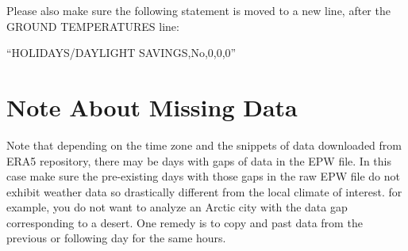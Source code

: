 \documentclass[12pt]{article}
\begin{document}
Please also make sure the following statement is moved to a new line, after the GROUND TEMPERATURES line:

``HOLIDAYS/DAYLIGHT SAVINGS,No,0,0,0''

\section{Note About Missing Data}

Note that depending on the time zone and the snippets of data downloaded from ERA5 repository, there may be days with gaps of data in the EPW file. In this case make sure the pre-existing days with those gaps in the raw EPW file do not exhibit weather data so drastically different from the local climate of interest. for example, you do not want to analyze an Arctic city with the data gap corresponding to a desert. One remedy is to copy and past data from the previous or following day for the same hours.  



\end{document}
